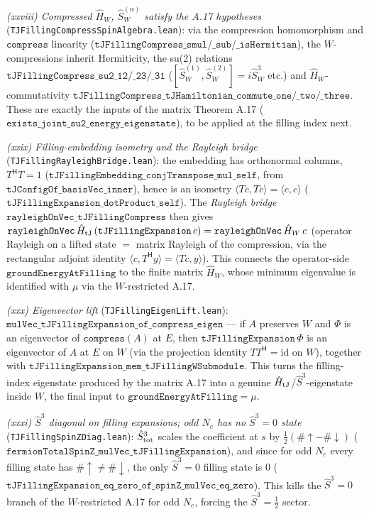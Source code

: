 \documentclass[a4paper,11pt]{article}
\begin{document}
\emph{(xxviii) Compressed $\hat H_W$, $\hat S^{(\alpha)}_W$ satisfy the A.17 hypotheses}
(\texttt{TJFillingCompressSpinAlgebra.lean}): via the compression homomorphism and $\texttt{compress}$
linearity ($\texttt{tJFillingCompress\_smul}$/$\texttt{\_sub}$/$\texttt{\_isHermitian}$), the
$W$-compressions inherit Hermiticity, the su(2) relations
$\texttt{tJFillingCompress\_su2\_12/\_23/\_31}$ ($[\hat S^{(1)}_W,\hat S^{(2)}_W]=i\hat S^3_W$ etc.)
and $\hat H_W$-commutativity $\texttt{tJFillingCompress\_tJHamiltonian\_commute\_one/\_two/\_three}$.
These are exactly the inputs of the matrix Theorem A.17
($\texttt{exists\_joint\_su2\_energy\_eigenstate}$), to be applied at the filling index next.

\emph{(xxix) Filling-embedding isometry and the Rayleigh bridge}
(\texttt{TJFillingRayleighBridge.lean}): the embedding has orthonormal columns,
$T^{\mathsf H} T = 1$ ($\texttt{tJFillingEmbedding\_conjTranspose\_mul\_self}$, from
$\texttt{tJConfigOf\_basisVec\_inner}$), hence is an isometry $\langle Tc,Tc\rangle=\langle c,c\rangle$
($\texttt{tJFillingExpansion\_dotProduct\_self}$).  The \emph{Rayleigh bridge}
$\texttt{rayleighOnVec\_tJFillingCompress}$ then gives
$\texttt{rayleighOnVec}\,\hat H_{\rm tJ}\,(\texttt{tJFillingExpansion}\,c)
=\texttt{rayleighOnVec}\,\hat H_W\,c$ (operator Rayleigh on a lifted state $=$ matrix Rayleigh of
the compression, via the rectangular adjoint identity $\langle c, T^{\mathsf H}y\rangle=\langle
Tc,y\rangle$).  This connects the operator-side $\texttt{groundEnergyAtFilling}$ to the finite
matrix $\hat H_W$, whose minimum eigenvalue is identified with $\mu$ via the $W$-restricted A.17.

\emph{(xxx) Eigenvector lift} (\texttt{TJFillingEigenLift.lean}):
$\texttt{mulVec\_tJFillingExpansion\_of\_compress\_eigen}$ --- if $A$ preserves $W$ and $\Phi$ is an
eigenvector of $\texttt{compress}(A)$ at $E$, then $\texttt{tJFillingExpansion}\,\Phi$ is an
eigenvector of $A$ at $E$ on $W$ (via the projection identity $T T^{\mathsf H}=\mathrm{id}$ on $W$),
together with $\texttt{tJFillingExpansion\_mem\_tJFillingWSubmodule}$.  This turns the filling-index
eigenstate produced by the matrix A.17 into a genuine $\hat H_{\rm tJ}$/$\hat S^3$-eigenstate inside
$W$, the final input to $\texttt{groundEnergyAtFilling}=\mu$.

\emph{(xxxi) $\hat S^3$ diagonal on filling expansions; odd $N_e$ has no $\hat S^3=0$ state}
(\texttt{TJFillingSpinZDiag.lean}): $\hat S^3_{\rm tot}$ scales the coefficient at $s$ by
$\tfrac12(\#{\uparrow}-\#{\downarrow})$ ($\texttt{fermionTotalSpinZ\_mulVec\_tJFillingExpansion}$), and
since for odd $N_e$ every filling state has $\#{\uparrow}\ne\#{\downarrow}$, the only $\hat S^3=0$
filling state is $0$ ($\texttt{tJFillingExpansion\_eq\_zero\_of\_spinZ\_mulVec\_eq\_zero}$).  This
kills the $\hat S^3=0$ branch of the $W$-restricted A.17 for odd $N_e$, forcing the
$\hat S^3=\tfrac12$ sector.
\end{document}
